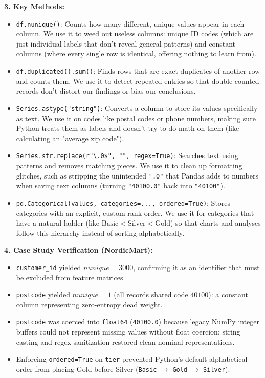 \documentclass[11pt,a4paper]{article}
\let\oldtexttt\texttt
\renewcommand{\texttt}[1]{{\color{codebase}\oldtexttt{#1}}}
\begin{document}
\vspace{0.4em}
\noindent\textbf{3. Key Methods:}\par\vspace{0.2em}
\begin{itemize}[leftmargin=*]
    \item \lstinline!df.nunique()!: Counts how many different, unique values appear in each column. We use it to weed out useless columns: unique ID codes (which are just individual labels that don't reveal general patterns) and constant columns (where every single row is identical, offering nothing to learn from).
    \item \lstinline!df.duplicated().sum()!: Finds rows that are exact duplicates of another row and counts them. We use it to detect repeated entries so that double-counted records don't distort our findings or bias our conclusions.
    \item \lstinline!Series.astype("string")!: Converts a column to store its values specifically as text. We use it on codes like postal codes or phone numbers, making sure Python treats them as labels and doesn't try to do math on them (like calculating an "average zip code").
    \item \lstinline!Series.str.replace(r"\.0$", "", regex=True)!: Searches text using patterns and removes matching pieces. We use it to clean up formatting glitches, such as stripping the unintended \texttt{".0"} that Pandas adds to numbers when saving text columns (turning \texttt{"40100.0"} back into \texttt{"40100"}).
    \item \lstinline!pd.Categorical(values, categories=..., ordered=True)!: Stores categories with an explicit, custom rank order. We use it for categories that have a natural ladder (like $\text{Basic} < \text{Silver} < \text{Gold}$) so that charts and analyses follow this hierarchy instead of sorting alphabetically.
\end{itemize}

\vspace{0.4em}
\noindent\textbf{4. Case Study Verification (NordicMart):}\par\vspace{0.2em}
\begin{itemize}[leftmargin=*]
    \item \lstinline!customer_id! yielded $nunique = 3000$, confirming it as an identifier that must be excluded from feature matrices.
    \item \lstinline!postcode! yielded $nunique = 1$ (all records shared code $40100$): a constant column representing zero-entropy dead weight.
    \item \lstinline!postcode! was coerced into \lstinline!float64! (\texttt{40100.0}) because legacy NumPy integer buffers could not represent missing values without float coercion; string casting and regex sanitization restored clean nominal representations.
    \item Enforcing \lstinline!ordered=True! on \lstinline!tier! prevented Python's default alphabetical order from placing Gold before Silver (\texttt{Basic} $\to$ \texttt{Gold} $\to$ \texttt{Silver}).
\end{itemize}
\end{document}

